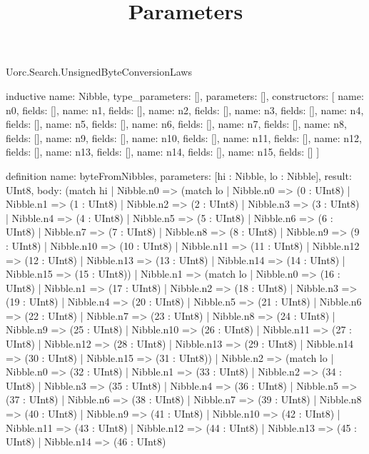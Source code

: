 \begin{lexlean}{Uorc.Search.UnsignedByteConversionLaws}
\title{Parameters}
\begin{semanticmodule}
inductive{
  name: Nibble,
  type_parameters: [],
  parameters: [],
  constructors: [
    {name: n0, fields: []},
    {name: n1, fields: []},
    {name: n2, fields: []},
    {name: n3, fields: []},
    {name: n4, fields: []},
    {name: n5, fields: []},
    {name: n6, fields: []},
    {name: n7, fields: []},
    {name: n8, fields: []},
    {name: n9, fields: []},
    {name: n10, fields: []},
    {name: n11, fields: []},
    {name: n12, fields: []},
    {name: n13, fields: []},
    {name: n14, fields: []},
    {name: n15, fields: []}
  ]
}

definition{
  name: byteFromNibbles,
  parameters: [hi : Nibble, lo : Nibble],
  result: UInt8,
  body: (match hi
    | Nibble.n0 => (match lo
      | Nibble.n0 => (0 : UInt8)
      | Nibble.n1 => (1 : UInt8)
      | Nibble.n2 => (2 : UInt8)
      | Nibble.n3 => (3 : UInt8)
      | Nibble.n4 => (4 : UInt8)
      | Nibble.n5 => (5 : UInt8)
      | Nibble.n6 => (6 : UInt8)
      | Nibble.n7 => (7 : UInt8)
      | Nibble.n8 => (8 : UInt8)
      | Nibble.n9 => (9 : UInt8)
      | Nibble.n10 => (10 : UInt8)
      | Nibble.n11 => (11 : UInt8)
      | Nibble.n12 => (12 : UInt8)
      | Nibble.n13 => (13 : UInt8)
      | Nibble.n14 => (14 : UInt8)
      | Nibble.n15 => (15 : UInt8))
    | Nibble.n1 => (match lo
      | Nibble.n0 => (16 : UInt8)
      | Nibble.n1 => (17 : UInt8)
      | Nibble.n2 => (18 : UInt8)
      | Nibble.n3 => (19 : UInt8)
      | Nibble.n4 => (20 : UInt8)
      | Nibble.n5 => (21 : UInt8)
      | Nibble.n6 => (22 : UInt8)
      | Nibble.n7 => (23 : UInt8)
      | Nibble.n8 => (24 : UInt8)
      | Nibble.n9 => (25 : UInt8)
      | Nibble.n10 => (26 : UInt8)
      | Nibble.n11 => (27 : UInt8)
      | Nibble.n12 => (28 : UInt8)
      | Nibble.n13 => (29 : UInt8)
      | Nibble.n14 => (30 : UInt8)
      | Nibble.n15 => (31 : UInt8))
    | Nibble.n2 => (match lo
      | Nibble.n0 => (32 : UInt8)
      | Nibble.n1 => (33 : UInt8)
      | Nibble.n2 => (34 : UInt8)
      | Nibble.n3 => (35 : UInt8)
      | Nibble.n4 => (36 : UInt8)
      | Nibble.n5 => (37 : UInt8)
      | Nibble.n6 => (38 : UInt8)
      | Nibble.n7 => (39 : UInt8)
      | Nibble.n8 => (40 : UInt8)
      | Nibble.n9 => (41 : UInt8)
      | Nibble.n10 => (42 : UInt8)
      | Nibble.n11 => (43 : UInt8)
      | Nibble.n12 => (44 : UInt8)
      | Nibble.n13 => (45 : UInt8)
      | Nibble.n14 => (46 : UInt8)
}
\end{semanticmodule}
\end{lexlean}
